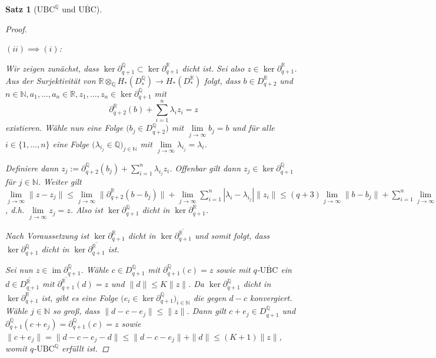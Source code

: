 \documentclass[a4paper,twoside,10pt]{scrreprt}
\DeclareMathOperator{\img}{im}
\newcommand{\UBC}{\text{UBC}}
\newcommand{\N}{\mathbb{N}}
\newcommand{\Q}{\mathbb{Q}}
\newcommand{\R}{\mathbb{R}}
\newtheorem{satz}{Satz}[section]
\theoremstyle{definition}
\begin{document}
\begin{satz}[$\UBC^{\Q}$ und $\overline{\UBC}$]
\begin{proof}
\begin{itemize}
\end{itemize}
$(ii)\implies(i)$:\par
Wir zeigen zunächst, dass $\ker\partial_{q+1}^{\Q}\subset \ker\partial_{q+1}^{\R}$ dicht ist. Sei also $z\in \ker\partial_{q+1}^{\R}$. Aus der Surjektivität von $\R\otimes_{\Q}H_*(D_*^{\Q})\to H_*(D_*^{\R})$ folgt, dass $b\in D_{q+2}^{\R}$ und $n\in\N,a_1,\ldots,a_n\in\R,z_1,\ldots,z_n\in \ker\partial_{q+1}^{\Q}$ mit 
\begin{equation*}
\partial_{q+2}^{\R}(b)+\sum\limits_{i=1}^n\lambda_iz_i=z
\end{equation*}
existieren. Wähle nun eine Folge $\bigl(b_j\in D_{q+2}^{\Q}\bigr)$ mit $\lim\limits_{j\to\infty}b_j=b$ und für alle $i\in \{1,\ldots,n\}$ eine Folge $\bigl(\lambda_{i_j}\in\Q\bigr)_{j\in\N}$ mit $\lim\limits_{j\to\infty}\lambda_{i_j}=\lambda_i$.\par
Definiere dann $z_j:=\partial_{q+2}^{\Q}(b_j)+\sum\limits_{i=1}^n\lambda_{i_j}z_i$. Offenbar gilt dann $z_j\in\ker\partial_{q+1}^{\Q}$ für $j\in\N$. Weiter gilt $\lim\limits_{j\to\infty}\|z-z_j\|\leq \lim\limits_{j\to\infty}\|\partial_{q+2}^{\R}(b-b_j)\|+\lim\limits_{j\to\infty}\sum\limits_{i=1}^n|\lambda_i-\lambda_{i_j}|\|z_i\|\leq (q+3)\lim\limits_{j\to\infty}\|b-b_j\|+\sum\limits_{i=1}^n\lim\limits_{j\to\infty}|\lambda_i-\lambda_{i_j}|\|z_i\|=0$, d.h. $\lim\limits_{j\to\infty}z_j=z$. Also ist $\ker\partial_{q+1}^{\Q}$ dicht in $\ker\partial_{q+1}^{\R}$.\par
Nach Voraussetzung ist $\ker \partial_{q+1}^{\R}$ dicht in $\ker \overline{\partial_{q+1}^{\R}}$ und somit folgt, dass $\ker \partial_{q+1}^{\Q}$ dicht in $\ker \overline{\partial_{q+1}^{\R}}$ ist.\par
Sei nun $z\in \img \partial_{q+1}^{\Q}$. Wähle $c\in D_{q+1}^{\Q}$ mit $\partial_{q+1}^{\Q}(c)=z$ sowie mit $q$-$\overline{\UBC}$ ein $d\in \overline{D_{q+1}^{\R}}$ mit $\overline{\partial_{q+1}^{\R}}(d)=z$ und $\|d\|\leq K\|z\|$. Da $\ker \partial_{q+1}^{\Q}$ dicht in $\ker \overline{\partial_{q+1}^{\R}}$ ist, gibt es eine Folge $\bigl(e_i\in \ker \partial_{q+1}^{\Q}\bigr)_{i\in\N}$ die gegen $d-c$ konvergiert. Wähle $j\in \N$ so groß, dass $\|d-c-e_j\|\leq \|z\|$. Dann gilt $c+e_j\in D_{q+1}^{\Q}$ und $\partial_{q+1}^{\Q}(c+e_j)=\partial_{q+1}^{\Q}(c)=z$ sowie $\|c+e_j\|=\|d-c-e_j-d\|\leq \|d-c-e_j\|+\|d\|\leq (K+1)\|z\|$, womit $q$-$\UBC^{\Q}$ erfüllt ist.
\end{proof}
\end{satz}
\end{document}
